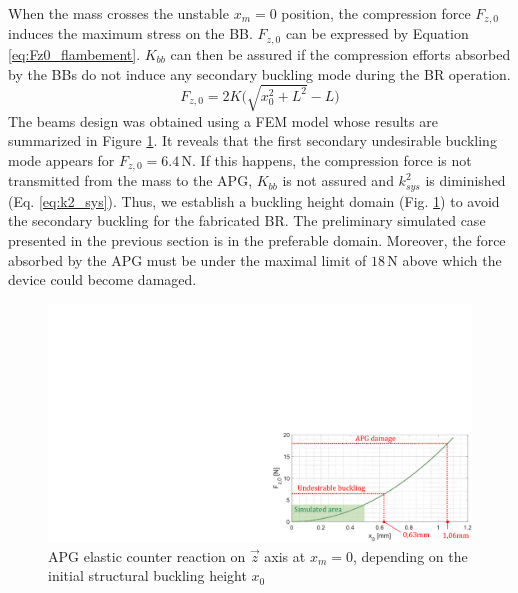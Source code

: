 \documentclass[3p,twocolumn,preprint]{elsarticle}
\begin{document}
When the mass crosses the unstable \mbox{$x_m=0$} position, the compression force $F_{z,0}$ induces the maximum stress on the BB. $F_{z,0}$ can be expressed by Equation \ref{eq:Fz0_flambement}. $K_{bb}$ can then be assured if the compression efforts absorbed by the BBs do not induce any secondary buckling mode during the BR operation. 
\begin{equation}
	F_{z,0} = 2K \biggl( \sqrt{x_0^2+L^2}-L \biggr)
	\label{eq:Fz0_flambement}
\end{equation}
The beams design was obtained using a FEM model whose results are summarized in Figure \ref{fig:buckling_limit}. It reveals that the first secondary undesirable buckling mode appears for $F_{z,0}=6.4$\,N. If this happens, the compression force is not transmitted from the mass to the APG, $K_{bb}$ is not assured and $k^2_{sys}$ is diminished (Eq. \ref{eq:k2_sys}). Thus, we establish a buckling height domain (Fig. \ref{fig:buckling_limit}) to avoid the secondary buckling for the fabricated BR. The preliminary simulated case presented in the previous section is in the preferable domain. Moreover, the force absorbed by the APG must be under the maximal limit of $18$\,N above which the device could become damaged.
\begin{figure}[!htbp]
	\centering
	\captionsetup{justification=centering}
	\includegraphics[trim={17.9cm 0cm 0cm 10cm},clip,width=0.9\linewidth]{figures/buckling_limit.pdf}
	\caption{APG elastic counter reaction on $\vec{z}$ axis at $x_m=0$, depending on the initial structural buckling height $x_0$}
	\label{fig:buckling_limit}
\end{figure}

\end{document}
